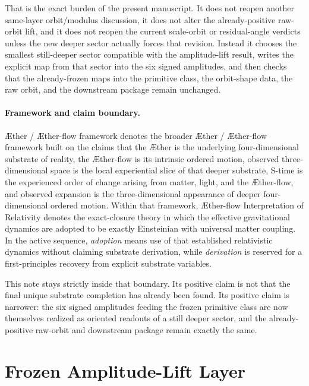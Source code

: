 \documentclass[11pt]{article}
\newcommand{\Aether}{\AE{}ther}
\newcommand{\Aflow}{\AE{}ther-flow}
\newcommand{\TheoryName}{\Aflow{} Interpretation of Relativity}
\newcommand{\TheoryProgram}{\Aether{} / \Aflow{} framework}
\begin{document}
That is the exact burden of the present manuscript. It does not reopen another same-layer orbit/modulus discussion, it does not alter the already-positive raw-orbit lift, and it does not reopen the current scale-orbit or residual-angle verdicts unless the new deeper sector actually forces that revision. Instead it chooses the smallest still-deeper sector compatible with the amplitude-lift result, writes the explicit map from that sector into the six signed amplitudes, and then checks that the already-frozen maps into the primitive class, the orbit-shape data, the raw orbit, and the downstream package remain unchanged.

\paragraph{Framework and claim boundary.}
\TheoryProgram{} denotes the broader \Aether{} / \Aflow{} framework built on the claims that the \Aether{} is the underlying four-dimensional substrate of reality, the \Aflow{} is its intrinsic ordered motion, observed three-dimensional space is the local experiential slice of that deeper substrate, S-time is the experienced order of change arising from matter, light, and the \Aflow{}, and observed expansion is the three-dimensional appearance of deeper four-dimensional ordered motion. Within that framework, \TheoryName{} denotes the exact-closure theory in which the effective gravitational dynamics are adopted to be exactly Einsteinian with universal matter coupling. In the active sequence, \emph{adoption} means use of that established relativistic dynamics without claiming substrate derivation, while \emph{derivation} is reserved for a first-principles recovery from explicit substrate variables.

This note stays strictly inside that boundary. Its positive claim is not that the final unique substrate completion has already been found. Its positive claim is narrower: the six signed amplitudes feeding the frozen primitive class are now themselves realized as oriented readouts of a still deeper sector, and the already-positive raw-orbit and downstream package remain exactly the same.

\section{Frozen Amplitude-Lift Layer}
\end{document}
